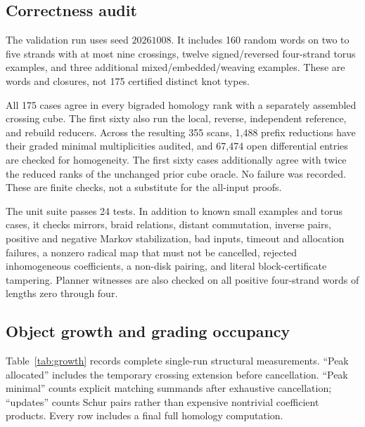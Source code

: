 \documentclass[11pt,letterpaper]{article}
\theoremstyle{remark}\newtheorem{remark}[theorem]{Remark}
\begin{document}
\subsection{Correctness audit}
The validation run uses seed $20261008$. It includes 160 random words on two to five strands with at most nine crossings, twelve signed/reversed four-strand torus examples, and three additional mixed/embedded/weaving examples. These are words and closures, not 175 certified distinct knot types.

All 175 cases agree in every bigraded homology rank with a separately assembled crossing cube. The first sixty also run the local, reverse, independent reference, and rebuild reducers. Across the resulting 355 scans, 1,488 prefix reductions have their graded minimal multiplicities audited, and 67,474 open differential entries are checked for homogeneity. The first sixty cases additionally agree with twice the reduced ranks of the unchanged prior cube oracle. No failure was recorded. These are finite checks, not a substitute for the all-input proofs.

The unit suite passes 24 tests. In addition to known small examples and torus cases, it checks mirrors, braid relations, distant commutation, inverse pairs, positive and negative Markov stabilization, bad inputs, timeout and allocation failures, a nonzero radical map that must not be cancelled, rejected inhomogeneous coefficients, a non-disk pairing, and literal block-certificate tampering. Planner witnesses are also checked on all positive four-strand words of lengths zero through four.

\subsection{Object growth and grading occupancy}
Table~\ref{tab:growth} records complete single-run structural measurements. ``Peak allocated'' includes the temporary crossing extension before cancellation. ``Peak minimal'' counts explicit matching summands after exhaustive cancellation; ``updates'' counts Schur pairs rather than expensive nontrivial coefficient products. Every row includes a final full homology computation.
\begin{table}[htbp]\centering\small

\caption{Structural counters from \texttt{results/growth.json}. Torus row $m$ means $(\sigma_1\sigma_2\sigma_3)^m$. The mixed and weaving words are specified in the JSON.}\label{tab:growth}
\end{table}
\end{document}
